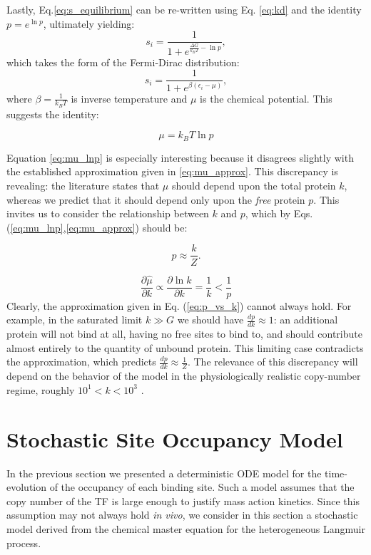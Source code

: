 \documentclass{article}
\begin{document}
Lastly, Eq.\ref{eq:s_equilibrium} can be re-written using
Eq. \ref{eq:kd} and the identity $p = e^{\ln p}$, ultimately yielding:
\begin{equation}
  s_i = \frac{1}{1 + e^{\frac{\Delta G}{k_BT}  - \ln p}},
\end{equation}
which takes the form of the Fermi-Dirac distribution:
\begin{equation}
  \label{eq:s_fd}
  s_i = \frac{1}{1 + e^{\beta(\epsilon_i - \mu)}},
\end{equation}
where $\beta = \frac{1}{k_BT}$ is inverse temperature and $\mu$ is the
chemical potential.  This suggests the identity:

\begin{equation}
  \label{eq:mu_lnp}
  \mu = k_BT \ln p
\end{equation}

Equation \ref{eq:mu_lnp} is especially interesting because it
disagrees slightly with the established approximation given in
\ref{eq:mu_approx}.  This discrepancy is revealing: the literature
states that $\mu$ should depend upon the total protein $k$, whereas we
predict that it should depend only upon the \textit{free} protein $p$.
This invites us to consider the relationship between $k$ and $p$,
which by Eqs. (\ref{eq:mu_lnp},\ref{eq:mu_approx}) should be:

\begin{equation}
  \label{eq:p_vs_k}
  p \approx \frac{k}{Z}.
\end{equation}

\begin{equation}
  \frac{\partial\hat\mu}{\partial k}\propto \frac{\partial\ln k}{\partial k} = \frac{1}{k} < \frac{1}{p}
\end{equation}
Clearly, the approximation given in Eq. (\ref{eq:p_vs_k}) cannot
always hold.  For example, in the saturated limit $k\gg G$ we should
have $\frac{dp}{dk}\approx 1$: an additional protein will not bind at
all, having no free sites to bind to, and should contribute almost
entirely to the quantity of unbound protein. This limiting case
contradicts the approximation, which predicts $\frac{dp}{dk}\approx
\frac{1}{Z}$.  The relevance of this discrepancy will depend on the
behavior of the model in the physiologically realistic copy-number
regime, roughly $10^1 < k < 10^3$ \cite{ishihama08}.  

\section{Stochastic Site Occupancy Model}
In the previous section we presented a deterministic ODE model for the
time-evolution of the occupancy of each binding site.  Such a model
assumes that the copy number of the TF is large enough to justify mass
action kinetics.  Since this assumption may not always hold \textit{in
  vivo}, we consider in this section a stochastic model derived from
the chemical master equation for the heterogeneous Langmuir process.
\end{document}
